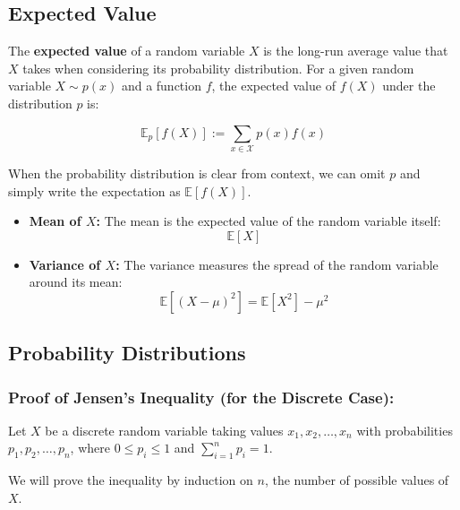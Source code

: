 \vspace{2em}

\subsection{Expected Value}

The \textbf{expected value} of a random variable \(X\) is the long-run average value that \(X\) takes when considering its probability distribution. For a given random variable \(X \sim p(x)\) and a function \(f\), the expected value of \(f(X)\) under the distribution \(p\) is:

\[
\mathbb{E}_p[f(X)] := \sum_{x \in \mathcal{X}} p(x) f(x)
\]

When the probability distribution is clear from context, we can omit \(p\) and simply write the expectation as \(\mathbb{E}[f(X)]\).

\begin{itemize}
    \item \textbf{Mean of \(X\):} The mean is the expected value of the random variable itself:
    \[
    \mathbb{E}[X]
    \]
    \item \textbf{Variance of \(X\):} The variance measures the spread of the random variable around its mean:
    \[
    \mathbb{E}[(X - \mu)^2] = \mathbb{E}[X^2] - \mu^2
    \]
\end{itemize}


\subsection{Probability Distributions}


\subsubsection{Proof of Jensen's Inequality (for the Discrete Case):} 

Let \( X \) be a discrete random variable taking values \( x_1, x_2, \dots, x_n \) with probabilities \( p_1, p_2, \dots, p_n \), where \( 0 \leq p_i \leq 1 \) and \( \sum_{i=1}^n p_i = 1 \).

We will prove the inequality by induction on \( n \), the number of possible values of \( X \).

